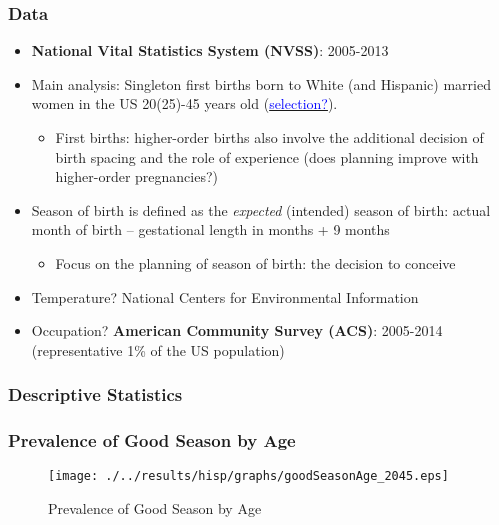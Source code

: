 \documentclass[10pt,letterpaper,subeqn]{beamer}
\begin{document}
\begin{frame}[label=Data]
\frametitle{Data}
\begin{itemize}
\item \textbf{National Vital Statistics System (NVSS)}: 2005-2013
\item Main analysis: Singleton first births born to White (and Hispanic) married women in the US 20(25)-45 years old (\hyperlink{ageHist}{\textcolor{blue}{selection?}}).
\begin{itemize}
\item First births: higher-order births also involve the additional decision of birth spacing and the role of experience (does planning improve with higher-order pregnancies?)
\end{itemize}
\item Season of birth is defined as the \emph{expected} (intended) season of birth: actual month of birth --  gestational length in months + 9 months
\begin{itemize}
\item Focus on the planning of season of birth: the decision to conceive
\end{itemize}
\item Temperature? National Centers for Environmental Information
\item Occupation? \textbf{American Community Survey (ACS)}: 2005-2014 (representative 1\% of the US population)
\end{itemize}
\end{frame}


\begin{frame}
\frametitle{Descriptive Statistics}

\end{frame}


\begin{frame}[label=ages]
\frametitle{Prevalence of Good Season by Age}
\begin{figure}[htpb!]
  \begin{center}
    \caption{Prevalence of Good Season by Age}
    \texttt{[image: ./../results/hisp/graphs/goodSeasonAge\_2045.eps]}
    \label{fig:goodByAge}
  \end{center}
\end{figure}
\end{frame}
\end{document}
